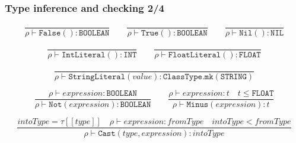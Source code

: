\documentclass[11pt]{beamer}  %
\begin{document}
\begin{frame}[fragile]\frametitle{Type inference and checking 2/4}

\[
 \frac{}
         {\rho\vdash\mathtt{False()}:\mathtt{BOOLEAN}}\qquad
 \frac{}
         {\rho\vdash\mathtt{True()}:\mathtt{BOOLEAN}}\qquad
 \frac{}
         {\rho\vdash\mathtt{Nil()}:\mathtt{NIL}}
\]

\[
  \frac{}
       {\rho\vdash\mathtt{IntLiteral()}:\mathtt{INT}}\qquad
  \frac{}
       {\rho\vdash\mathtt{FloatLiteral()}:\mathtt{FLOAT}}
\]

\[
  \frac{}
       {\rho\vdash\mathtt{StringLiteral(\mathit{value})}:
       \mathtt{ClassType.mk(STRING)}}
\]

 \[
    \frac{\rho\vdash\mathit{expression}:\mathtt{BOOLEAN}}
         {\rho\vdash\mathtt{Not(\mathit{expression})}:\mathtt{BOOLEAN}}
    \qquad
    \frac{\rho\vdash\mathit{expression}:t\quad t\le\mathtt{FLOAT}}
         {\rho\vdash\mathtt{Minus(\mathit{expression})}:t}
  \]

  \[
    \frac{
          \mathit{intoType}=\tau[\![\mathit{type}]\!]\quad
          \rho\vdash\mathit{expression}:\mathit{fromType}\quad
          \mathit{intoType} < \mathit{fromType}}
         {\rho\vdash\mathtt{Cast(\mathit{type},\mathit{expression})}:
          \mathit{intoType}}
  \]

\end{frame}
\end{document}

